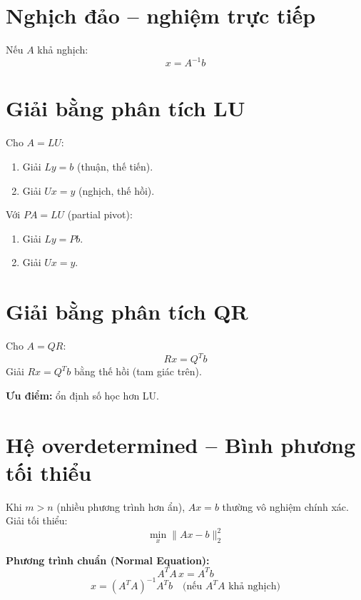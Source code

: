 \section{Nghịch đảo -- nghiệm trực tiếp}

Nếu $A$ khả nghịch:
\[
x = A^{-1}b
\]

\section{Giải bằng phân tích LU}

Cho $A = LU$:
\begin{enumerate}
    \item Giải $Ly = b$ \quad (thuận, thế tiến).
    \item Giải $Ux = y$ \quad (nghịch, thế hồi).
\end{enumerate}

Với $PA = LU$ (partial pivot):
\begin{enumerate}
    \item Giải $Ly = Pb$.
    \item Giải $Ux = y$.
\end{enumerate}

\section{Giải bằng phân tích QR}

Cho $A = QR$:
\[
Rx = Q^T b
\]
Giải $Rx = Q^Tb$ bằng thế hồi (tam giác trên).

\textbf{Ưu điểm:} ổn định số học hơn LU.

\section{Hệ overdetermined -- Bình phương tối thiểu}

Khi $m > n$ (nhiều phương trình hơn ẩn), $Ax = b$ thường vô nghiệm chính xác. Giải tối thiểu:
\[
\min_x \|Ax - b\|_2^2
\]

\textbf{Phương trình chuẩn (Normal Equation):}
\[
A^T A \, x = A^T b
\]
\[
x = (A^T A)^{-1} A^T b \quad \text{(nếu } A^TA \text{ khả nghịch)}
\]

